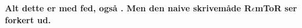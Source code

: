 \bfseries Alt dette er med fed, også \RemToR. Men den naive skrivemåde
R$\epsilon$mToR ser forkert ud.
